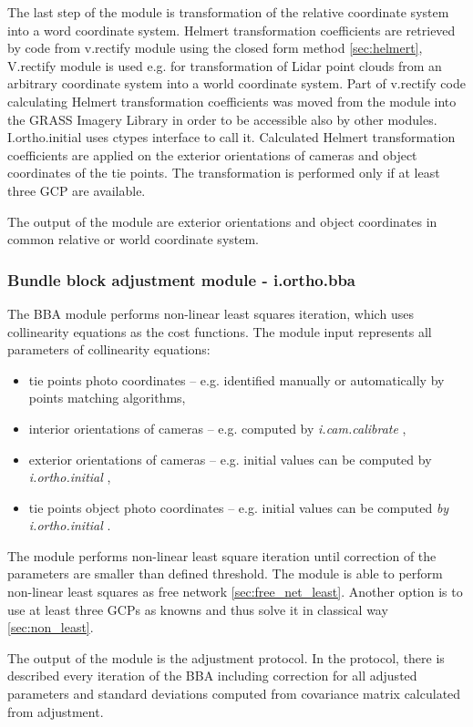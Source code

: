 \documentclass[a4paper,12pt]{article}
\newcommand{\term}[1]{%
{\it #1}%
}
\begin{document}
The last step of the module is transformation of the relative coordinate system into a word coordinate system.
Helmert 
transformation coefficients are retrieved by code from v.rectify module \cite{v.rectify} using 
the closed form method \ref{sec:helmert},
V.rectify module  is used e.g. for transformation of Lidar point clouds from an arbitrary coordinate system into 
a world coordinate system. 
Part of v.rectify code calculating Helmert transformation coefficients
was moved from the module into the GRASS Imagery Library in order to be accessible also by other modules.
I.ortho.initial uses ctypes interface to call it.
Calculated Helmert transformation coefficients are applied on the exterior orientations of cameras and object coordinates of the tie points.
The transformation is performed only if at least three GCP are available.

The output of the module are exterior orientations and object coordinates in common relative or world coordinate system. 


\subsubsection{Bundle block adjustment module - i.ortho.bba}

The BBA module performs non-linear least squares iteration, which 
uses collinearity equations as the cost functions. 
The module input represents all parameters of collinearity equations:
\begin{itemize}
\item tie points photo coordinates -- e.g. identified manually or automatically by points matching algorithms,
\item interior orientations of cameras -- e.g. computed by \term{i.cam.calibrate},
\item exterior orientations of cameras -- e.g. initial values can be computed by \term{i.ortho.initial},
\item tie points object photo coordinates -- e.g. initial values can be computed \term{by i.ortho.initial}.
\end{itemize}

The module performs non-linear least square iteration until correction of the parameters are smaller than
defined threshold. The module is able to perform non-linear least squares as free network \ref{sec:free_net_least}.
Another option is to use at least three GCPs 
as knowns and thus solve it in classical way \ref{sec:non_least}. 

The output of the module is the adjustment protocol. In the protocol, there
is described every iteration of the BBA including correction for all adjusted parameters and standard deviations computed from 
covariance matrix calculated from adjustment. 
\end{document}

